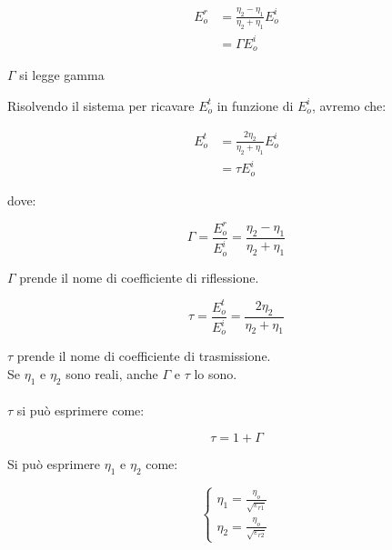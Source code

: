 {\Large \begin{equation}
    \begin{split}
        E_o ^{r} 
        &= \frac{\eta_2 - \eta_1}{\eta_2 + \eta_1} E_o ^{i} 
        \\
        &= \Gamma E_o ^{i}   
    \end{split}
\end{equation}}

\begin{tcolorbox}
    $\Gamma$ si legge gamma 
\end{tcolorbox}

Risolvendo il sistema per ricavare $E_o ^{t}$ in funzione di $E_o ^{i}$, avremo che: 

{\Large \begin{equation}
    \begin{split}
        E_o ^{t} 
        &= \frac{2 \eta_2 }{\eta_2 + \eta_1} E_o ^{i} 
        \\
        &=  \tau E_o ^{i}   
    \end{split}
\end{equation}}

dove: 

{\Large \begin{equation}
    \Gamma = \frac{E_o ^{r}}{E_o ^{i}} = \frac{\eta_2 - \eta_1}{\eta_2 + \eta_1}
\end{equation}}

$\Gamma$ prende il nome di coefficiente di riflessione. 

{\Large \begin{equation}
    \tau = \frac{E_o ^{t}}{E_o ^{i}} = \frac{2 \eta_2}{\eta_2 + \eta_1} 
\end{equation}}

$\tau$ prende il nome di coefficiente di trasmissione. \\ 

Se $\eta_1$ e $\eta_2$ sono reali, anche $\Gamma$ e $\tau$ lo sono. \\ \\  

$\tau$ si può esprimere come: 

{\Large \begin{equation}
    \tau = 1 + \Gamma    
\end{equation}}

Si può esprimere $\eta_1$ e $\eta_2$ come: 

{\Large \begin{equation}
    \begin{cases}
        \eta_1 = \frac{\eta_o}{\sqrt{\varepsilon_{r1}}} \\ 
        \eta_2 = \frac{\eta_o}{\sqrt{\varepsilon_{r2}}} 
    \end{cases}
\end{equation}}

